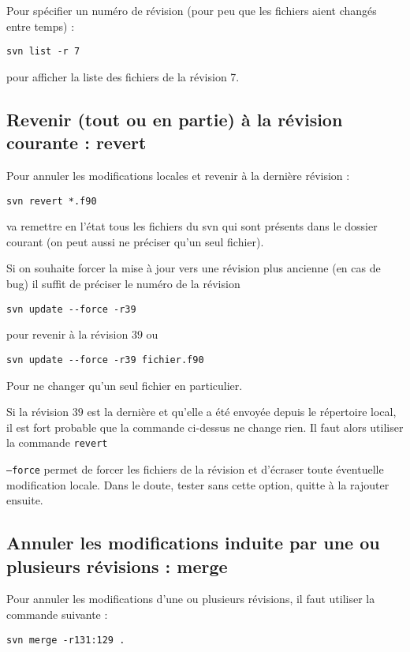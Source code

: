 \documentclass[a4paper,twoside]{article}
\begin{document}
Pour spécifier un numéro de révision (pour peu que les fichiers aient changés entre temps) : 
\begin{verbatim}
svn list -r 7
\end{verbatim}
pour afficher la liste des fichiers de la révision 7.

\subsection{Revenir (tout ou en partie) à la révision courante : revert}
Pour annuler les modifications locales et revenir à la dernière révision : 
\begin{verbatim}
svn revert *.f90
\end{verbatim}
va remettre en l'état tous les fichiers du svn qui sont présents dans le dossier courant (on peut aussi ne préciser qu'un seul fichier).

\bigskip

Si on souhaite forcer la mise à jour vers une révision plus ancienne (en cas de bug) il suffit de préciser le numéro de la révision
\begin{verbatim}
svn update --force -r39
\end{verbatim}
pour revenir à la révision $39$ ou 
\begin{verbatim}
svn update --force -r39 fichier.f90
\end{verbatim}
Pour ne changer qu'un seul fichier en particulier.

\begin{remarque}
Si la révision $39$ est la dernière et qu'elle a été envoyée depuis le répertoire local, il est fort probable que la commande ci-dessus ne change rien. Il faut alors utiliser la commande \texttt{revert}

\texttt{--force} permet de forcer les fichiers de la révision et d'écraser toute éventuelle modification locale. Dans le doute, tester sans cette option, quitte à la rajouter ensuite.
\end{remarque}

\subsection{Annuler les modifications induite par une ou plusieurs révisions : merge}
Pour annuler les modifications d'une ou plusieurs révisions, il faut utiliser la commande suivante : 
\begin{verbatim}
svn merge -r131:129 .
\end{verbatim}
\end{document}
